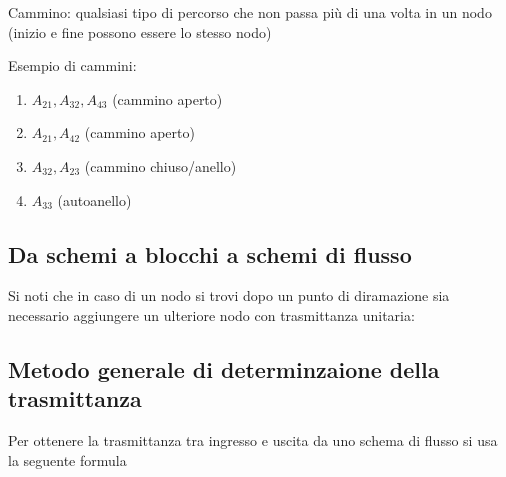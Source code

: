 \begin{definizione}
	Cammino: qualsiasi tipo di percorso che non passa più di una volta in un nodo (inizio e fine possono essere lo stesso nodo)
	
	\begin{center}
	
	\end{center}
	
	Esempio di cammini:
	\begin{enumerate}
		\item $ A_{21},A_{32},A_{43} $ (cammino aperto)
		\item $ A_{21},A_{42} $ (cammino aperto)
		\item $ A_{32},A_{23} $ (cammino chiuso/anello)
		\item $ A_{33} $ (autoanello)
	\end{enumerate}

\subsection{Da schemi a blocchi a schemi di flusso}
		
		
\end{definizione}
\begin{osservazione}
	Si noti che in caso di un nodo si trovi dopo un punto di diramazione sia necessario aggiungere un ulteriore nodo con trasmittanza unitaria:
	\begin{center}
	
	\end{center}
\end{osservazione}

\subsection{Metodo generale di determinzaione della trasmittanza}

Per ottenere la trasmittanza tra ingresso e uscita da uno schema di flusso si usa la seguente formula

